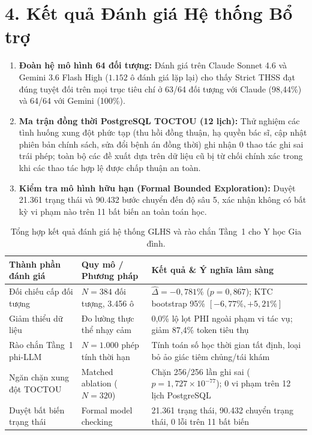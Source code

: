 \documentclass[11pt]{article}
\begin{document}
\section*{4. Kết quả Đánh giá Hệ thống Bổ trợ}
\begin{enumerate}[leftmargin=1.8em]
\item \textbf{Đoàn hệ mô hình 64 đối tượng:} Đánh giá trên Claude Sonnet 4.6 và Gemini 3.6 Flash High ($1.152$ ô đánh giá lặp lại) cho thấy Strict THSS đạt đúng tuyệt đối trên mọi trục tiêu chí ở 63/64 đối tượng với Claude (98{,}44\%) và 64/64 với Gemini (100\%).
\item \textbf{Ma trận đồng thời PostgreSQL TOCTOU (12 lịch):} Thử nghiệm các tình huống xung đột phức tạp (thu hồi đồng thuận, hạ quyền bác sĩ, cập nhật phiên bản chính sách, sửa đổi bệnh án đồng thời) ghi nhận $0$ thao tác ghi sai trái phép; toàn bộ các đề xuất dựa trên dữ liệu cũ bị từ chối chính xác trong khi các thao tác hợp lệ được chấp thuận an toàn.
\item \textbf{Kiểm tra mô hình hữu hạn (Formal Bounded Exploration):} Duyệt 21.361 trạng thái và 90.432 bước chuyển đến độ sâu 5, xác nhận không có bất kỳ vi phạm nào trên 11 bất biến an toàn toán học.
\end{enumerate}

\begin{table}[H]\centering\small
\caption{Tổng hợp kết quả đánh giá hệ thống GLHS và rào chắn Tầng~1 cho Y học Gia đình.}
\vspace{0.4em}
\begin{tabularx}{\textwidth}{p{}p{}X}
\toprule
\textbf{Thành phần đánh giá} & \textbf{Quy mô / Phương pháp} & \textbf{Kết quả \& Ý nghĩa lâm sàng} \\
\midrule
Đối chiếu cấp đối tượng & $N=384$ đối tượng, 3.456 ô & $\hat{\Delta} = -0{,}781\%$ ($p=0{,}867$); KTC bootstrap 95\% $[-6{,}77\%, +5{,}21\%]$ \\
Giảm thiểu dữ liệu & Đo lường thực thể nhạy cảm & 0{,}0\% lộ lọt PHI ngoài phạm vi tác vụ; giảm 87{,}4\% token tiêu thụ \\
Rào chắn Tầng~1 phi-LLM & $N=1.000$ phép tính thời hạn & Tính toán số học thời gian tất định, loại bỏ ảo giác tiêm chủng/tái khám \\
Ngăn chặn xung đột TOCTOU & Matched ablation ($N=320$) & Chặn 256/256 lần ghi sai ($p=1{,}727 \times 10^{-77}$); 0 vi phạm trên 12 lịch PostgreSQL \\
Duyệt bất biến trạng thái & Formal model checking & 21.361 trạng thái, 90.432 chuyển trạng thái, 0 lỗi trên 11 bất biến \\
\bottomrule
\end{tabularx}
\end{table}
\end{document}
